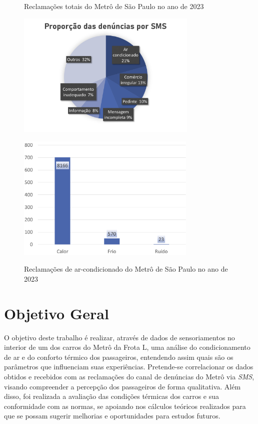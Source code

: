 \documentclass[acronym,symbols,table]{fei}
\begin{document}
\begin{figure}[!htb]
	\centering
	\begin{minipage}{0.5\textwidth}
		\caption{Reclamações totais do Metrô de São Paulo no ano de 2023}
		\includegraphics[width=\linewidth, height=6cm]{Imagens/Grafico_reclamacoes_totais.png}
		\label{fig:grafico_total}
	\end{minipage}\hfill
	\begin{minipage}{0.45\textwidth}
		\caption{Reclamações de ar-condicionado do Metrô de São Paulo no ano de 2023}
		\includegraphics[width=\linewidth, height=6cm]{Imagens/Grafico_reclamacoes_ar.png}
		\label{fig:grafico_ar}
	\end{minipage}
\end{figure}

\newpage 

\section{Objetivo Geral}

O objetivo deste trabalho é realizar, através de dados de sensoriamentos no interior de um dos carros do Metrô da Frota L, uma análise do condicionamento de ar e do conforto térmico dos passageiros, entendendo assim quais são os parâmetros que influenciam suas experiências. Pretende-se correlacionar os dados obtidos e recebidos com as reclamações do canal de denúncias do Metrô via \textit{SMS}, visando compreender a percepção dos passageiros de forma qualitativa. Além disso, foi realizada a avaliação das condições térmicas dos carros e sua conformidade com as normas, se apoiando nos cálculos teóricos realizados para que se possam sugerir melhorias e oportunidades para estudos futuros. 
\end{document}
